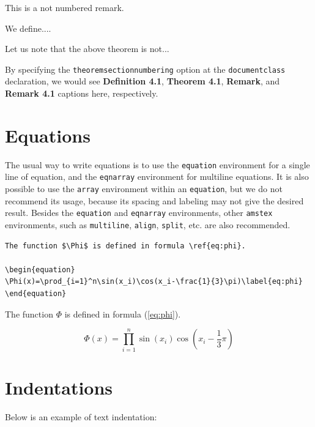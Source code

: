 \documentclass[theoremcontinuousnumbering,withtitlethanks]{actacyb}
\begin{document}
\begin{nnremark}
This is a not numbered remark.
\end{nnremark}

\begin{definition}
We define....
\end{definition}

\begin{remark}
Let us note that the above theorem is not...
\end{remark}

By specifying the {\tt theoremsectionnumbering} option at the \verb|documentclass|
declaration, we would see \textbf{Definition 4.1}, \textbf{Theorem 4.1}, \textbf{Remark}, and \textbf{Remark 4.1} captions here, respectively.


\section{Equations}

The usual way to write equations is to use the \verb|equation| environment for a single line
of equation, and the \verb|eqnarray| environment for multiline equations.
It is also possible to use the \verb|array| environment within an \verb|equation|,
but we do not recommend its usage, because its spacing and labeling may not give the desired result.
Besides the \verb|equation| and \verb|eqnarray| environments,
other \verb|amstex| environments, such as \verb|multiline|, \verb|align|, \verb|split|, etc. 
are also recommended.

\begin{verbatim}
The function $\Phi$ is defined in formula \ref{eq:phi}.

\begin{equation}
\Phi(x)=\prod_{i=1}^n\sin(x_i)\cos(x_i-\frac{1}{3}\pi)\label{eq:phi}
\end{equation}
\end{verbatim}

The function $\Phi$ is defined in formula (\ref{eq:phi}).

\begin{equation}
\Phi(x)=\prod_{i=1}^n\sin(x_i)\cos(x_i-\frac{1}{3}\pi)\label{eq:phi}
\end{equation}


\section{Indentations}

Below is an example of text indentation:
\end{document}
